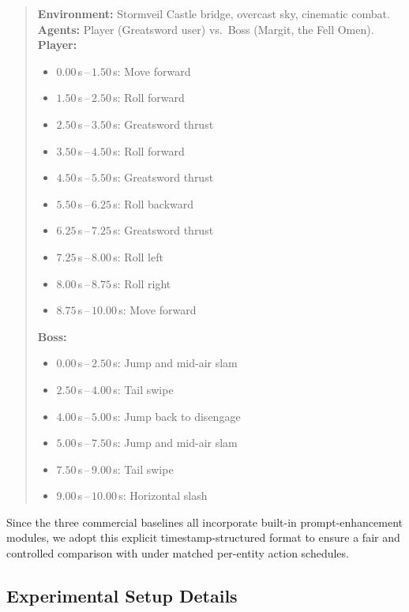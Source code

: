 \begin{quote}
\noindent\textbf{Environment:} Stormveil Castle bridge, overcast sky, cinematic combat.\\
\textbf{Agents:} Player (Greatsword user) vs.\ Boss (Margit, the Fell Omen).
\noindent\textbf{Player:}
\begin{itemize}[noitemsep, topsep=2pt, leftmargin=1.5em]
    \item $0.00$\,s\,--\,$1.50$\,s:\; Move forward
    \item $1.50$\,s\,--\,$2.50$\,s:\; Roll forward
    \item $2.50$\,s\,--\,$3.50$\,s:\; Greatsword thrust
    \item $3.50$\,s\,--\,$4.50$\,s:\; Roll forward
    \item $4.50$\,s\,--\,$5.50$\,s:\; Greatsword thrust
    \item $5.50$\,s\,--\,$6.25$\,s:\; Roll backward
    \item $6.25$\,s\,--\,$7.25$\,s:\; Greatsword thrust
    \item $7.25$\,s\,--\,$8.00$\,s:\; Roll left
    \item $8.00$\,s\,--\,$8.75$\,s:\; Roll right
    \item $8.75$\,s\,--\,$10.00$\,s:\; Move forward
\end{itemize}
\noindent\textbf{Boss:}
\begin{itemize}[noitemsep, topsep=2pt, leftmargin=1.5em]
    \item $0.00$\,s\,--\,$2.50$\,s:\; Jump and mid-air slam
    \item $2.50$\,s\,--\,$4.00$\,s:\; Tail swipe
    \item $4.00$\,s\,--\,$5.00$\,s:\; Jump back to disengage
    \item $5.00$\,s\,--\,$7.50$\,s:\; Jump and mid-air slam
    \item $7.50$\,s\,--\,$9.00$\,s:\; Tail swipe
    \item $9.00$\,s\,--\,$10.00$\,s:\; Horizontal slash
\end{itemize}
\end{quote}

Since the three commercial baselines all incorporate built-in prompt-enhancement modules, we adopt this explicit timestamp-structured format to ensure a fair and controlled comparison with \methodname under matched per-entity action schedules.

\subsection{Experimental Setup Details}
\label{app:setup_details}
\label{app:details}

